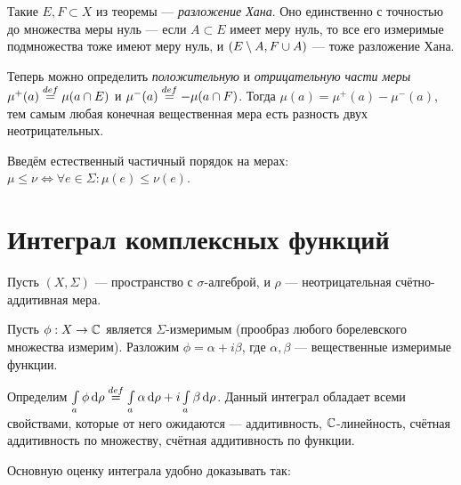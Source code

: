 \documentclass[a4paper]{report}
\begin{document}
    Такие $E, F \subset X$ из теоремы --- \emph{разложение Хана}.
    Оно единственно с точностью до множества меры нуль --- если $A \subset E$ имеет меру нуль, то все его измеримые подмножества тоже имеют меру нуль, и $(E \setminus A, F \cup A)$ --- тоже разложение Хана.

    Теперь можно определить \emph{положительную} и \emph{отрицательную части меры} $\mu^+(a) \overset{def}{=} \mu(a \cap E)$ и $\mu^-(a) \overset{def}{=} -\mu(a \cap F)$.
    Тогда $\mu(a) = \mu^{+}(a) - \mu^-(a)$, тем самым любая конечная вещественная мера есть разность двух неотрицательных.

    Введём естественный частичный порядок на мерах: $\mu \le \nu \iff \forall e \in \Sigma: \mu(e) \le \nu(e)$.
    \section{Интеграл комплексных функций}
    Пусть $(X, \Sigma)$ --- пространство с $\sigma$-алгеброй, и $\rho$ --- неотрицательная счётно-аддитивная мера.

    Пусть $\phi: X \rightarrow \mathbb{C}$ является $\Sigma$-измеримым (прообраз любого борелевского множества измерим).
    Разложим $\phi = \alpha + i\beta$, где $\alpha, \beta$ --- вещественные измеримые функции.

    Определим $\int\limits_{a}\phi \operatorname{d}\!\rho \overset{def}{=} \int\limits_{a}\alpha\operatorname{d}\!\rho + i\int\limits_{a}\beta\operatorname{d}\!\rho$.
    Данный интеграл обладает всеми свойствами, которые от него ожидаются --- аддитивность, $\mathbb{C}$-линейность, счётная аддитивность по множеству, счётная аддитивность по функции.

    Основную оценку интеграла удобно доказывать так:
\end{document}
